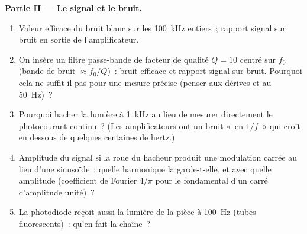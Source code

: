 \begin{problem}
\medskip
\noindent\textbf{Partie II --- Le signal et le bruit.}
\begin{enumerate}[resume]
  \item Valeur efficace du bruit blanc sur les \qty{100}{kHz} entiers~;
        rapport signal sur bruit en sortie de l'amplificateur.
  \item On insère un filtre passe-bande de facteur de qualité $Q = 10$ centré sur $f_0$
        (bande de bruit $\approx f_0/Q$)~: bruit efficace et rapport signal sur bruit.
        Pourquoi cela ne suffit-il pas pour une mesure précise (penser aux
        dérives et au \qty{50}{Hz})~?
  \item Pourquoi hacher la lumière à \qty{1}{kHz} au lieu de mesurer directement le
        photocourant continu~? (Les amplificateurs ont un bruit «~en $1/f$~» qui croît
        en dessous de quelques centaines de hertz.)
  \item Amplitude du signal si la roue du hacheur produit une modulation
        carrée au lieu d'une sinusoïde~: quelle harmonique la 
        garde-t-elle, et avec quelle amplitude (coefficient de Fourier $4/\pi$ pour le
        fondamental d'un carré d'amplitude unité)~?
  \item La photodiode reçoit aussi la lumière de la pièce à \qty{100}{Hz}
        (tubes fluorescents)~: qu'en fait la chaîne~?
\end{enumerate}


\end{problem}
